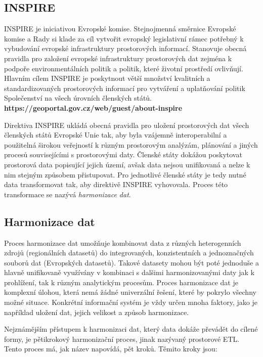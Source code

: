 \subsection{INSPIRE}

INSPIRE je iniciativou Evropské komise. Stejnojmenná směrnice Evropské komise a Rady si klade za cíl vytvořit evropský legislativní rámec potřebný k vybudování evropské infrastruktury prostorových informací. Stanovuje obecná pravidla pro založení evropské infrastruktury prostorových dat zejména k podpoře environmentálních politik a politik, které životní prostředí ovlivňují. Hlavním cílem INSPIRE je poskytnout větší množství kvalitních a standardizovaných prostorových informací pro vytváření a uplatňování politik Společenství na všech úrovních členských států. 
\textbf{https://geoportal.gov.cz/web/guest/about-inspire}

Direktiva INSPIRE ukládá obecná pravidla pro uložení prostorových dat všech členských států Evropské Unie tak, aby byla vzájemně interoperabilní a použitelná širokou veřejností k různým prostorovým analýzám, plánování a jiných procesů souvisejícími s prostorovými daty. Členské státy dokážou poskytovat prostorová data popisující jejich území, avšak data nejsou unifikovaná a nelze k nim stejným způsobem přistupovat. Pro jednotlivé členské státy je tedy nutné data transformovat tak, aby direktivě INSPIRE vyhovovala. Proces této transformace se nazývá \textit{harmonizace dat}.

\subsection{Harmonizace dat}

Proces harmonizace dat umožňuje kombinovat data z různých heterogenních zdrojů (regionálních datasetů) do integrovaných, konzistentních a jednoznačných souborů dat (Evropských datasetů). Takové datasety mohou být poté jednoduše a hlavně unifikovaně využívány v kombinaci s dalšimi harmonizovanými daty jak k prohlížení, tak k různým analytickým procesům. Proces harmonizace dat je komplexní úlohou, která nemá žádné univerzální řešení, které by pokrylo všechny možné situace. Konkrétní informační systém je vždy určen mnoha faktory, jako je například uložení dat, jejich velikost a způsob harmonizace. 

Nejznámějším přístupem k harmonizaci dat, který data dokáže převádět do cílené formy, je pětikrokový harmonizační proces, jinak nazývaný prostorové ETL. Tento proces má, jak název napovídá, pět kroků. Těmito kroky jsou: 

